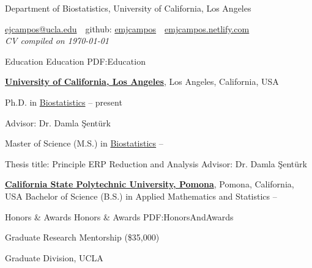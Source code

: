 \documentclass[letterpaper,MMMyyyy,nonstopmode]{simpleresumecv}
\newcommand{\CVAuthor}{Emilie Campos}
\newcommand{\CVNote}{CV compiled on {\today}}
\newcommand{\CVWebpage}{emjcampos.netlify.com}
\begin{document}

\Title{\CVAuthor}

\begin{SubTitle}
{Department of Biostatistics, University of California, Los Angeles}
\par
\href{mailto:ejcampos@ucla.edu}
{ejcampos@ucla.edu}
\,\SubBulletSymbol\,
github: \href{https://github.com/emjcampos}{\url{emjcampos}}
\,\SubBulletSymbol\,
\href{https://emjcampos.netlify.com}
{\url{\CVWebpage}}\\
\textit{\CVNote}
\end{SubTitle}

\begin{Body}


\Section
{Education}
{Education}
{PDF:Education}

\Entry
\href{http://www.biostat.ucla.edu}
{\textbf{University of California, Los Angeles}},
Los Angeles, California, USA

\BigGap
Ph.D. in
\href{http://www.biostat.ucla.edu}
{Biostatistics}
\hfill
{} -- present
\begin{Detail}
\SubBulletItem
Advisor:
Dr. Damla \c{S}ent\"{u}rk
\end{Detail}

\BigGap
Master of Science (M.S.) in
\href{http://www.biostat.ucla.edu}
{Biostatistics}
\hfill
{} --
\begin{Detail}
\SubBulletItem
Thesis title: Principle ERP Reduction and Analysis
\href{http://www.example.com/my-phd-thesis}
{}
\SubBulletItem
Advisor: Dr. Damla \c{S}ent\"{u}rk
\end{Detail}

\BigGap
\Entry
\href{https://www.cpp.edu/sci/mathematics-statistics/index.shtml}
{\textbf{California State Polytechnic University, Pomona}}, 
Pomona, California, USA
\BigGap
Bachelor of Science (B.S.) in Applied Mathematics and Statistics
\hfill
{} --


\Section
{Honors \&\newline
Awards}
{Honors \& Awards}
{PDF:HonorsAndAwards}

Graduate Research Mentorship (\$35,000) \hfill {}
\begin{Detail} 
Graduate Division, UCLA
\end{Detail}
\BigGap


\end{Body}
\end{document}

